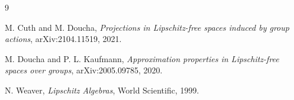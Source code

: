 \documentclass[11pt]{article}
\begin{document}
\begin{thebibliography}{9}

M. Cuth and M. Doucha,
\emph{Projections in Lipschitz-free spaces induced by group actions},
arXiv:2104.11519, 2021.

M. Doucha and P. L. Kaufmann,
\emph{Approximation properties in Lipschitz-free spaces over groups},
arXiv:2005.09785, 2020.

N. Weaver,
\emph{Lipschitz Algebras},
World Scientific, 1999.

\end{thebibliography}
\end{document}
